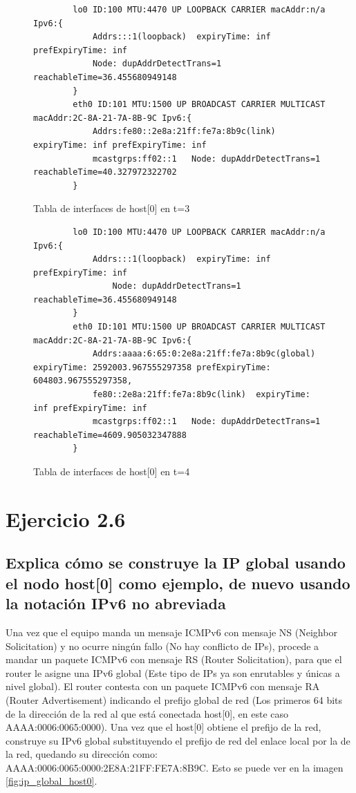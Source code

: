 \begin{figure}[H]
    \centering
    \begin{lstlisting}
        lo0 ID:100 MTU:4470 UP LOOPBACK CARRIER macAddr:n/a Ipv6:{
            Addrs:::1(loopback)  expiryTime: inf prefExpiryTime: inf
            Node: dupAddrDetectTrans=1 reachableTime=36.455680949148
        }
        eth0 ID:101 MTU:1500 UP BROADCAST CARRIER MULTICAST macAddr:2C-8A-21-7A-8B-9C Ipv6:{
            Addrs:fe80::2e8a:21ff:fe7a:8b9c(link)  expiryTime: inf prefExpiryTime: inf
            mcastgrps:ff02::1 	Node: dupAddrDetectTrans=1 reachableTime=40.327972322702
        }
    \end{lstlisting}
    \caption{Tabla de interfaces de host[0] en t=3}
    \label{fig:InterfaceTablePostLocal}
\end{figure}

\begin{figure}[H]
    \centering
    \begin{lstlisting}
        lo0 ID:100 MTU:4470 UP LOOPBACK CARRIER macAddr:n/a Ipv6:{
            Addrs:::1(loopback)  expiryTime: inf prefExpiryTime: inf
                Node: dupAddrDetectTrans=1 reachableTime=36.455680949148
        }
        eth0 ID:101 MTU:1500 UP BROADCAST CARRIER MULTICAST macAddr:2C-8A-21-7A-8B-9C Ipv6:{
            Addrs:aaaa:6:65:0:2e8a:21ff:fe7a:8b9c(global)  expiryTime: 2592003.967555297358 prefExpiryTime: 604803.967555297358, 	
            fe80::2e8a:21ff:fe7a:8b9c(link)  expiryTime: inf prefExpiryTime: inf
            mcastgrps:ff02::1 	Node: dupAddrDetectTrans=1 reachableTime=4609.905032347888
        }
    \end{lstlisting}
    \caption{Tabla de interfaces de host[0] en t=4}
    \label{fig:InterfaceTablePostGlobal}
\end{figure}

\section{Ejercicio 2.6}
\subsection{Explica cómo se construye la IP global usando el nodo host[0] como ejemplo, de nuevo usando la notación
IPv6 no abreviada}

Una vez que el equipo manda un mensaje ICMPv6 con mensaje NS (Neighbor Solicitation) y no ocurre ningún fallo (No hay conflicto de IPs), procede a mandar un paquete ICMPv6 con mensaje RS (Router Solicitation), para que el router le asigne una IPv6 global (Este tipo de IPs ya son enrutables y únicas a nivel global). El router contesta con un paquete ICMPv6 con mensaje RA (Router Advertisement) indicando el prefijo global de red (Los primeros 64 bits de la dirección de la red al que está conectada host[0], en este caso AAAA:0006:0065:0000). Una vez que el host[0] obtiene el prefijo de la red, construye su IPv6 global substituyendo el prefijo de red del enlace local por la de la red, quedando su dirección como: AAAA:0006:0065:0000:2E8A:21FF:FE7A:8B9C. Esto se puede ver en la imagen \ref{fig:ip_global_host0}.


